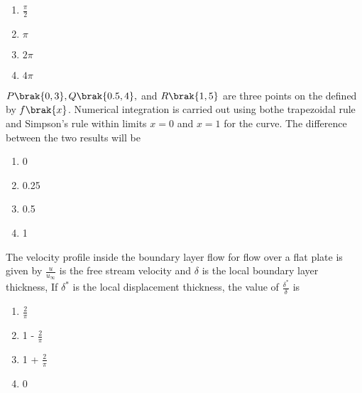         \hfill{}
        \begin{multicols}{4}
            \begin{enumerate}
                \item $\frac{\pi}{2}$
                    \columnbreak
                \item $\pi$
                    \columnbreak
                \item $2\pi$
                    \columnbreak
                \item $4\pi$
            \end{enumerate}
        \end{multicols}
    \item $P\brak{0, 3}, Q\brak{0.5, 4},$ and $R\brak{1, 5}$ are three points on the defined by $f\brak{x}$.
        Numerical integration is carried out using bothe trapezoidal rule and Simpson's rule within limits
        $x = 0$ and $x = 1$ for the curve. The difference between the two results will be
        \hfill{}
        \begin{multicols}{4}
            \begin{enumerate}
                \item 0
                    \columnbreak
                \item 0.25
                    \columnbreak
                \item 0.5
                    \columnbreak
                \item 1
            \end{enumerate}
        \end{multicols}
    \item The velocity profile inside the boundary layer flow for flow over a flat plate is given by 
        $\frac{u}{u_{\infty}}$ is the free stream velocity and $\delta$ is the local boundary layer
        thickness, If $\delta ^*$ is the local displacement thickness, the value of $\frac{\delta ^ *}{\delta}$ is
        \hfill{}
        \begin{multicols}{4}
            \begin{enumerate}
                \item $\frac{2}{\pi}$
                    \columnbreak
                \item 1 - $\frac{2}{\pi}$
                    \columnbreak
                \item 1 + $\frac{2}{\pi}$
                    \columnbreak
                \item 0
            \end{enumerate}
        \end{multicols}
